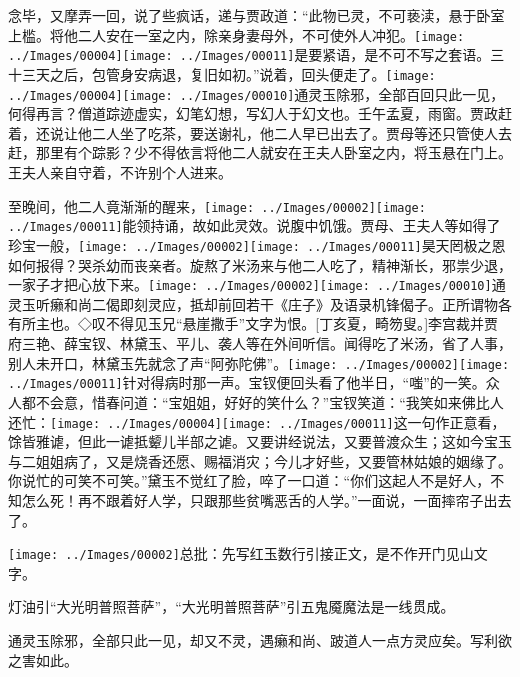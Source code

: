 念毕，又摩弄一回，说了些疯话，递与贾政道：``此物已灵，不可亵渎，悬于卧室上槛。将他二人安在一室之内，除亲身妻母外，不可使外人冲犯。{\texttt{[image: ../Images/00004]}\texttt{[image: ../Images/00011]}\footnotesize \kaishu 是要紧语，是不可不写之套语。}三十三天之后，包管身安病退，复旧如初。''说着，回头便走了。{\texttt{[image: ../Images/00004]}\texttt{[image: ../Images/00010]}\footnotesize \kaishu 通灵玉除邪，全部百回只此一见，何得再言？僧道踪迹虚实，幻笔幻想，写幻人于幻文也。壬午孟夏，雨窗。}贾政赶着，还说让他二人坐了吃茶，要送谢礼，他二人早已出去了。贾母等还只管使人去赶，那里有个踪影？少不得依言将他二人就安在王夫人卧室之内，将玉悬在门上。
王夫人亲自守着，不许别个人进来。

至晚间，他二人竟渐渐的醒来，{\texttt{[image: ../Images/00002]}\texttt{[image: ../Images/00011]}\footnotesize \kaishu 能领持诵，故如此灵效。}说腹中饥饿。贾母、王夫人等如得了珍宝一般，{\texttt{[image: ../Images/00002]}\texttt{[image: ../Images/00011]}\footnotesize \kaishu 昊天罔极之恩如何报得？哭杀幼而丧亲者。}旋熬了米汤来与他二人吃了，精神渐长，邪祟少退，一家子才把心放下来。{\texttt{[image: ../Images/00002]}\texttt{[image: ../Images/00010]}\footnotesize \kaishu 通灵玉听癞和尚二偈即刻灵应，抵却前回若干《庄子》及语录机锋偈子。正所谓物各有所主也。◇叹不得见玉兄``悬崖撒手''文字为恨。{[}丁亥夏，畸笏叟。{]}}李宫裁并贾府三艳、薛宝钗、林黛玉、平儿、袭人等在外间听信。闻得吃了米汤，省了人事，别人未开口，林黛玉先就念了声``阿弥陀佛''。{\texttt{[image: ../Images/00002]}\texttt{[image: ../Images/00011]}\footnotesize \kaishu 针对得病时那一声。}宝钗便回头看了他半日，``嗤''的一笑。众人都不会意，惜春问道：``宝姐姐，好好的笑什么？''宝钗笑道：``我笑如来佛比人还忙：{\texttt{[image: ../Images/00004]}\texttt{[image: ../Images/00011]}\footnotesize \kaishu 这一句作正意看，馀皆雅谑，但此一谑抵颦儿半部之谑。}又要讲经说法，又要普渡众生；这如今宝玉与二姐姐病了，又是烧香还愿、赐福消灾；今儿才好些，又要管林姑娘的姻缘了。你说忙的可笑不可笑。''黛玉不觉红了脸，啐了一口道：``你们这起人不是好人，不知怎么死！再不跟着好人学，只跟那些贫嘴恶舌的人学。''一面说，一面摔帘子出去了。

\texttt{[image: ../Images/00002]}{总批：先写红玉数行引接正文，是不作开门见山文字。}

{灯油引``大光明普照菩萨''，``大光明普照菩萨''引五鬼魇魔法是一线贯成。}

{通灵玉除邪，全部只此一见，却又不灵，遇癞和尚、跛道人一点方灵应矣。写利欲之害如此。}

